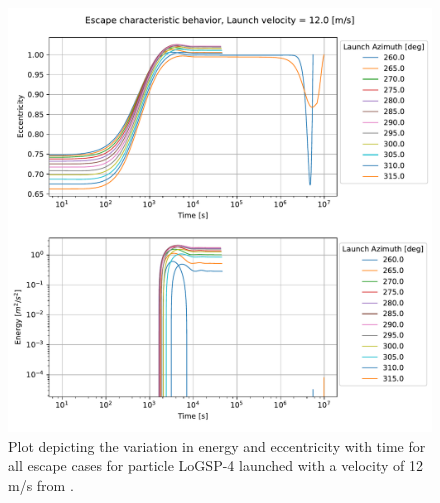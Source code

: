 \begin{figure}[!h]
\centering
\captionsetup{justification=centering}
\includegraphics[width=\textwidth, height=0.5\textheight, keepaspectratio=true]{leading_edge_perturbations/logsp4_escape_energy_ecc_12ms_solarPhase225.pdf}
\caption{Plot depicting the variation in energy and eccentricity with time for all escape cases for particle LoGSP-4 launched with a velocity of 12 m/s from \protect{}.}
\label{fig:leadingEdge_logsp4_escape_energy_ecc_12ms_solar225}
\end{figure}
\FloatBarrier
